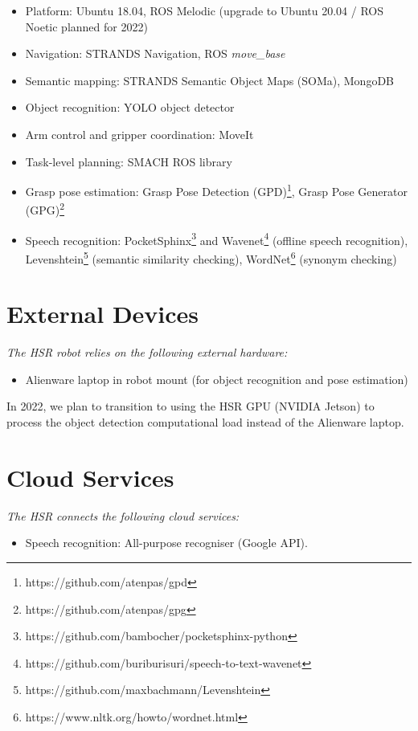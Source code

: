 \begin{itemize}
	\item Platform: Ubuntu 18.04, ROS Melodic (upgrade to Ubuntu 20.04 / ROS Noetic planned for 2022) 
	\item Navigation: STRANDS Navigation, ROS  \textit{move\_base}
	\item Semantic mapping: STRANDS Semantic Object Maps (SOMa), MongoDB
	\item Object recognition: YOLO object detector
	\item Arm control and gripper coordination: MoveIt
	\item Task-level planning: SMACH ROS library
	\item Grasp pose estimation: Grasp Pose Detection  (GPD)\footnote{https://github.com/atenpas/gpd}, Grasp Pose Generator (GPG)\footnote{https://github.com/atenpas/gpg}
	\item Speech recognition: PocketSphinx\footnote{https://github.com/bambocher/pocketsphinx-python} and Wavenet\footnote{https://github.com/buriburisuri/speech-to-text-wavenet} (offline speech recognition), Levenshtein\footnote{https://github.com/maxbachmann/Levenshtein} (semantic similarity checking), WordNet\footnote{https://www.nltk.org/howto/wordnet.html} (synonym checking) 
\end{itemize}

\section*{External Devices}

\textit{The HSR robot relies on the following external hardware:}

\begin{itemize}
	\item Alienware laptop in robot mount (for object recognition and pose estimation)
\end{itemize}

In 2022, we plan to transition to using the HSR GPU (NVIDIA Jetson) to process the object detection computational load instead of the Alienware laptop.

\section*{Cloud Services}

\textit{The HSR connects the following cloud services:}
\begin{itemize}
	\item Speech recognition: All-purpose recogniser (Google API).
\end{itemize}